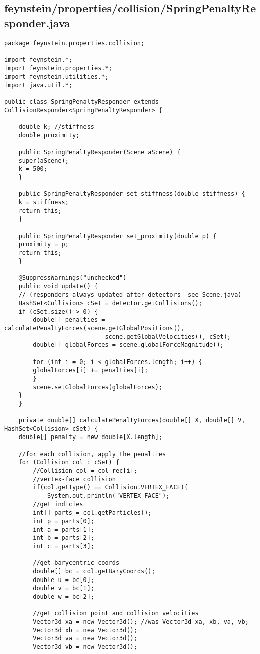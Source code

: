 \subsection*{feynstein/properties/collision/SpringPenaltyResponder.java}
\begin{lstlisting}
package feynstein.properties.collision;

import feynstein.*;
import feynstein.properties.*;
import feynstein.utilities.*;
import java.util.*;

public class SpringPenaltyResponder extends CollisionResponder<SpringPenaltyResponder> {
    
    double k; //stiffness
    double proximity;

    public SpringPenaltyResponder(Scene aScene) {
	super(aScene);
	k = 500;
    }

    public SpringPenaltyResponder set_stiffness(double stiffness) {
	k = stiffness;
	return this;
    }

    public SpringPenaltyResponder set_proximity(double p) {
	proximity = p;
	return this;
    }

    @SuppressWarnings("unchecked")
    public void update() {
	// (responders always updated after detectors--see Scene.java)
	HashSet<Collision> cSet = detector.getCollisions();
	if (cSet.size() > 0) {
	    double[] penalties = calculatePenaltyForces(scene.getGlobalPositions(), 
							scene.getGlobalVelocities(), cSet);
	    double[] globalForces = scene.globalForceMagnitude();

	    for (int i = 0; i < globalForces.length; i++) {
		globalForces[i] += penalties[i];
	    }
	    scene.setGlobalForces(globalForces);
	}
    }

    private double[] calculatePenaltyForces(double[] X, double[] V, HashSet<Collision> cSet) {
	double[] penalty = new double[X.length];

	//for each collision, apply the penalties
	for (Collision col : cSet) {
	    //Collision col = col_rec[i];
	    //vertex-face collision
	    if(col.getType() == Collision.VERTEX_FACE){
			System.out.println("VERTEX-FACE");
		//get indicies
		int[] parts = col.getParticles();
		int p = parts[0];
		int a = parts[1]; 
		int b = parts[2]; 
		int c = parts[3];

		//get barycentric coords
		double[] bc = col.getBaryCoords();
		double u = bc[0];
		double v = bc[1];
		double w = bc[2];

		//get collision point and collision velocities
		Vector3d xa = new Vector3d(); //was Vector3d xa, xb, va, vb;
		Vector3d xb = new Vector3d();
		Vector3d va = new Vector3d();
		Vector3d vb = new Vector3d();


\end{lstlisting}
